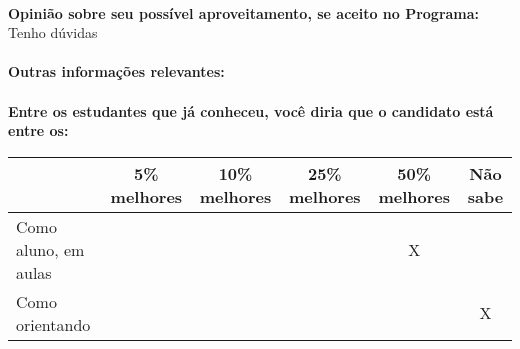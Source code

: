 \documentclass[11pt]{article}
\begin{document}
\\
\textbf{Opinião sobre seu possível aproveitamento, se aceito no Programa:}
\\Tenho dúvidas\\ 
\\
\textbf{Outras informações relevantes:} \\
\\[0.3cm]
\textbf{Entre os estudantes que já conheceu, você diria que o candidato está entre os:}
\\
\begin{tabular}{|l|c|c|c|c|c|}
\hline
 & 5\% melhores & 10\% melhores & 25\% melhores & 50\% melhores & Não sabe \\
\hline
Como aluno, em aulas &  &  &  & X & \\
\hline
Como orientando &  &  &  &  & X\\
\hline
\end{tabular}
\end{document}
